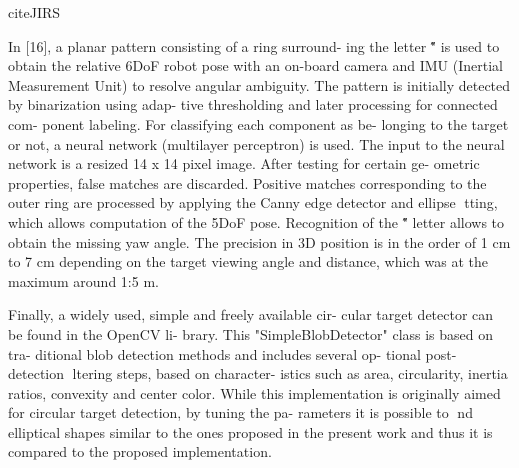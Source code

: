 \documentclass[a4paper]{report}
\begin{document}
cite{JIRS}

In [16], a planar pattern consisting of a ring surround-
ing the letter \H" is used to obtain the relative 6DoF
robot pose with an on-board camera and IMU (Inertial
Measurement Unit) to resolve angular ambiguity. The
pattern is initially detected by binarization using adap-
tive thresholding and later processing for connected com-
ponent labeling. For classifying each component as be-
longing to the target or not, a neural network (multilayer
perceptron) is used. The input to the neural network is a
resized 14 x 14 pixel image. After testing for certain ge-
ometric properties, false matches are discarded. Positive
matches corresponding to the outer ring are processed
by applying the Canny edge detector and ellipse tting,
which allows computation of the 5DoF pose. Recognition
of the \H" letter allows to obtain the missing yaw angle.
The precision in 3D position is in the order of 1 cm to
7 cm depending on the target viewing angle and distance,
which was at the maximum around 1:5 m.

Finally, a widely used, simple and freely available cir-
cular target detector can be found in the OpenCV li-
brary. This "SimpleBlobDetector" class is based on tra-
ditional blob detection methods and includes several op-
tional post-detection ltering steps, based on character-
istics such as area, circularity, inertia ratios, convexity
and center color. While this implementation is originally
aimed for circular target detection, by tuning the pa-
rameters it is possible to nd elliptical shapes similar
to the ones proposed in the present work and thus it is
compared to the proposed implementation.
\end{document}

